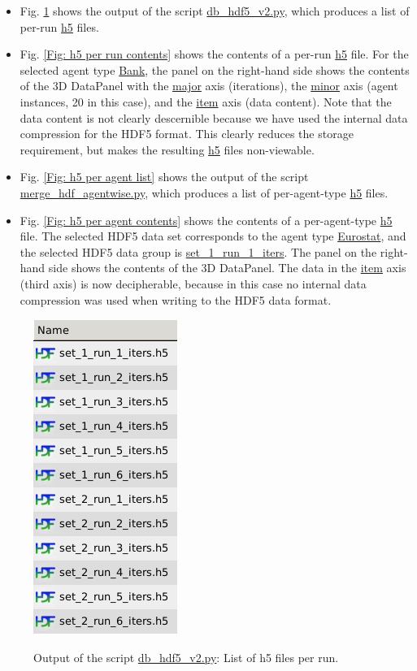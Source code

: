 \documentclass[10pt,a4paper]{article}
\begin{document}
\begin{itemize}
\item Fig. \ref{Fig: h5 per run list} shows the output of the script \url{db_hdf5_v2.py}, which produces a list of per-run \url{h5} files.

\item Fig. \ref{Fig: h5 per run contents} shows the contents of a per-run \url{h5} file. For the selected agent type \url{Bank}, the panel on the right-hand side shows the contents of the 3D DataPanel with the \url{major} axis (iterations), the \url{minor} axis (agent instances, 20 in this case), and the \url{item} axis (data content). Note that the data content is not clearly descernible because we have used the internal data compression for the HDF5 format. This clearly reduces the storage requirement, but makes the resulting \url{h5} files non-viewable.

\item Fig. \ref{Fig: h5 per agent list} shows the output of the script \url{merge_hdf_agentwise.py}, which produces a list of per-agent-type \url{h5} files.

\item Fig. \ref{Fig: h5 per agent contents} shows the contents of a per-agent-type \url{h5} file. The selected HDF5 data set corresponds to the agent type \url{Eurostat}, and the selected HDF5 data group is \url{set_1_run_1_iters}. The panel on the right-hand side shows the contents of the 3D DataPanel. The data in the \url{item} axis (third axis) is now decipherable, because in this case no internal data compression was used when writing to the HDF5 data format.
\end{itemize}


\begin{figure}[htb!]
\centering\leavevmode
\graphicspath{{./hdf5_snapshots/}}
%
\centering\leavevmode
\includegraphics[scale=.4]{Fig_0_list_of_separate_hdf5_files.png} 
\label{Fig: h5 per run list}
\caption{\footnotesize Output of the script \url{db_hdf5_v2.py}: List of h5 files per run.}
\end{figure}
\end{document}
